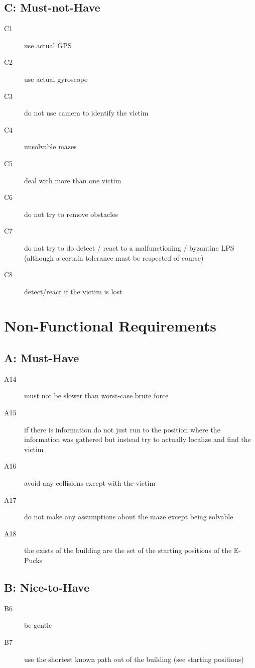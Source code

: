 \documentclass[a4paper,parskip,headheight=38pt]{scrartcl} %
\begin{document}
\subsection*{C: Must-not-Have}
\begin{description}
\item[C1] use actual GPS
\item[C2] use actual gyroscope
\item[C3] do not use camera to identify the victim
\item[C4] unsolvable mazes
\item[C5] deal with more than one victim
\item[C6] do not try to remove obstacles
\item[C7] do not try to do detect / react to a malfunctioning / byzantine LPS (although a certain tolerance must be respected of course)
\item[C8] detect/react if the victim is lost
\end{description}

\section{Non-Functional Requirements}
\subsection*{A: Must-Have}
\begin{description}
\item[A14] must not be slower than worst-case brute force
\item[A15] if there is information do not just run to the position where the information was gathered but instead try to actually localize and find the victim
\item[A16] avoid any collisions except with the victim
\item[A17] do not make any assumptions about the maze except being solvable
\item[A18] the exists of the building are the set of the starting positions of the E-Pucks
\end{description}

\subsection*{B: Nice-to-Have}
\begin{description}
\item[B6] be gentle
\item[B7] use the shortest known path out of the building (see starting positions)
\end{description}
\end{document}
